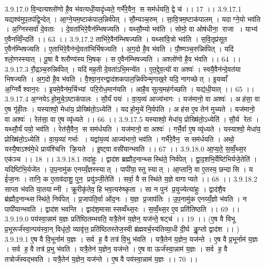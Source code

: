 3.9.17.0
वि॒न्दत्यश्लो॑णो है॒व भ॑वत्यधी॒यादृ॑ध्यते॒ गर्भै॑रे॒वैन॒॒ स सम॑र्धयति॒ द्वे च॑ ।। 17 ।।
3.9.17.1
यद्यश्व॑मुप॒तप॑द्वि॒न्देत् । आ॒ग्ने॒यम॒ष्टाक॑पाल॒न्निर्व॑पेत् । सौ॒म्यञ्च॒रुम् । सा॒वि॒त्रम॒ष्टाक॑पालम् । यदाग्ने॒यो भव॑ति । अ॒ग्निस्सर्वा॑ दे॒वताः । दे॒वता॑भिरे॒वैन॑म्भिषज्यति । यथ्सौ॒म्यो भव॑ति । सोमो॒ वा ओष॑धीना॒॒ राजा । याभ्य॑ ए॒वैनव्विँ॒न्दति॑ ।। 63 ।।
3.9.17.2
ताभि॑रे॒वैन॑म्भिषज्यति । यथ्सा॑वि॒त्रो भव॑ति । स॒वि॒तृप्र॑सूत ए॒वैन॑म्भिषज्यति । ए॒ताभि॑रे॒वैन॑न्दे॒वता॑भिर्भिषज्यति । अ॒ग॒दो है॒व भ॑वति । पौ॒ष्णञ्च॒रुन्निर्व॑पेत् । यदि॑ श्लो॒णस्स्यात् । पू॒षा वै श्लौण्य॑स्य भि॒षक् । स ए॒वैन॑म्भिषज्यति । अश्लो॑णो है॒व भ॑वति ।। 64 ।।
3.9.17.3
रौ॒द्रञ्च॒रुन्निर्व॑पेत् । यदि॑ मह॒ती दे॒वता॑ऽभि॒मन्ये॑त । ए॒त॒द्दे॒व॒त्यो॑ वा अश्वः॑ । स्वयै॒वैन॑न्दे॒वत॑या भिषज्यति । अ॒ग॒दो है॒व भ॑वति । वै॒श्वा॒न॒रन्द्वाद॑शकपाल॒न्निर्व॑पेन्मृगाख॒रे यदि॒ नागच्छेत् । इ॒यव्वाँ अ॒ग्निर्वैश्वान॒रः । इ॒यमे॒वैन॑म॒र्चिभ्यां परि॒रोध॒मान॑यति । आहै॒व सुत्य॒मह॑र्गच्छति । यद्य॑धी॒यात् ।। 65 ।।
3.9.17.4
अ॒ग्नयेऽ॑हो॒मुचे॒ऽष्टाक॑पालः । सौ॒र्यं पयः॑ । वा॒य॒व्य॑ आज्य॑भागः । यज॑मानो॒ वा अश्वः॑ । अह॑सा॒ वा ए॒ष गृ॑ही॒तः । यस्याश्वो॒ मेधा॑य॒ प्रोख्षि॑तो॒ऽध्येति॑ । यद॑हो॒मुचे॑ नि॒र्वप॑ति । अह॑स ए॒व तेन॑ मुच्यते । यज॑मानो॒ वा अश्वः॑ । रेत॑सा॒ वा ए॒ष व्यृ॑ध्यते ।। 66 ।।
3.9.17.5
यस्याश्वो॒ मेधा॑य॒ प्रोख्षि॑तो॒ऽध्येति॑ । सौ॒र्य रेतः॑ । यथ्सौ॒र्यं पयो॒ भव॑ति । रेत॑सै॒वैन॒॒ स सम॑र्धयति । यज॑मानो॒ वा अश्वः॑ । गर्भै॒र्वा ए॒ष व्यृ॑ध्यते । यस्याश्वो॒ मेधा॑य॒ प्रोख्षि॑तो॒ऽध्येति॑ । वा॒य॒व्या॑ गर्भाः । यद्वा॑य॒व्य॑ आज्य॑भागो॒ भव॑ति । गर्भै॑रे॒वैन॒ स सम॑र्धयति । अथो॒ यस्यै॒षाऽश्व॑मे॒धे प्राय॑श्चित्ति क्रि॒यते । इ॒ष्ट्वा वसी॑यान्भवति ।। 67 ।।
3.9.18.0
आ॒प्य॒ते॒ स॒व्वँ॒थ्स॒र एक॑ञ्च ।। 18 ।।
3.9.18.1
तदा॑हुः । द्वाद॑श ब्रह्मौद॒नान्थ्सस्थि॑ते॒ निर्व॑पेत् । द्वा॒द॒शभि॒र्वेष्टि॑भिर्यजे॒तेति॑ । यदिष्टि॑भि॒र्यजे॑त । उ॒प॒नामु॑क एनय्यँ॒ज्ञस्स्यात् । पापी॑या॒॒स्तु स्यात् । आ॒प्तानि॒ वा ए॒तस्य॒ छन्दा॑सि । य ई॑जा॒नः । तानि॒ क ए॒ताव॑दाशु॒ पुन॒ प्रयु॑ञ्जी॒तेति॑ । सर्वा॒ वै सस्थि॑ते य॒ज्ञे वागाप्यते ।। 68 ।।
3.9.18.2
साप्ता भ॑वति या॒तयाम्नी । क्रू॒रीकृ॑तेव॒ हि भव॒त्यरु॑ष्कृता । सा न पुन॑ प्र॒युज्येत्या॑हुः । द्वाद॑शै॒व ब्र॑ह्मौद॒नान्थ्सस्थि॑ते॒ निर्व॑पेत् । प्र॒जाप॑ति॒र्वा ओ॑द॒नः । य॒ज्ञ प्र॒जाप॑तिः । उ॒प॒नामु॑क एनय्यँ॒ज्ञो भ॑वति । न पापी॑यान्भवति । द्वाद॑श भवन्ति । द्वाद॑श॒मासास्सव्वँथ्स॒रः । स॒व्वँ॒थ्स॒र ए॒व प्रति॑तिष्ठति ।। 69 ।।
3.9.19.0
पय॑स्वा॒न्नाम॑ य॒ज्ञः प्रति॑ष्ठितम्भवति॒ यत्रै॒तेन॑ य॒ज्ञेन॒ यज॑न्ते॒ षट्च॑ ।। 19 ।। (ए॒ष वै विभू प्र॒भूरूर्ज॑स्वा॒न्पय॑स्वा॒न् विधृ॑तो॒ व्यावृ॑त्त॒प्रति॑ष्ठितस्तेज॒स्वी ब्र॑ह्मवर्च॒स्य॑तिव्या॒धी दी॒र्घ कॢ॒प्तो द्वाद॑श ।। )
3.9.19.1
ए॒ष वै वि॒भूर्नाम॑ य॒ज्ञः । सर्व॑ ह॒ वै तत्र॑ वि॒भु भ॑वति । यत्रै॒तेन॑ य॒ज्ञेन॒ यज॑न्ते । ए॒ष वै प्र॒भूर्नाम॑ य॒ज्ञः । सर्व॑ ह॒ वै तत्र॑ प्र॒भु भ॑वति । यत्रै॒तेन॑ य॒ज्ञेन॒ यज॑न्ते । ए॒ष वा ऊर्ज॑स्वा॒न्नाम॑ य॒ज्ञः । सर्व॑ ह॒ वै तत्रोर्ज॑स्वद्भवति । यत्रै॒तेन॑ य॒ज्ञेन॒ यज॑न्ते । ए॒ष वै पय॑स्वा॒न्नाम॑ य॒ज्ञः ।। 70 ।।

